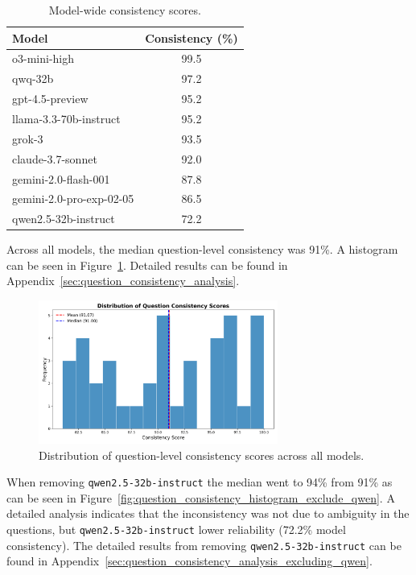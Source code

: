 \begin{table}[htbp]
    \centering
    \caption{Model-wide consistency scores.}
    \label{tab:model_consistency}
    \begin{tabular}{l c}
        \hline
        Model & Consistency (\%) \\
        \hline
        o3-mini-high & 99.5 \\
        qwq-32b & 97.2 \\
        gpt-4.5-preview & 95.2 \\
        llama-3.3-70b-instruct & 95.2 \\
        grok-3 & 93.5 \\
        claude-3.7-sonnet & 92.0 \\
        gemini-2.0-flash-001 & 87.8 \\
        gemini-2.0-pro-exp-02-05 & 86.5 \\
        qwen2.5-32b-instruct & 72.2 \\
        \hline
    \end{tabular}
\end{table}

Across all models, the median question-level consistency was 91\%. A histogram can be seen in Figure~\ref{fig:question_consistency_histogram}. Detailed results can be found in Appendix~\ref{sec:question_consistency_analysis}.

\begin{figure}[htbp]
    \centering
    \includegraphics[width=0.7\textwidth]{figures/histogram_question_consistency.png}
    \caption{Distribution of question-level consistency scores across all models.}
    \label{fig:question_consistency_histogram}
\end{figure}

When removing \texttt{qwen2.5-\allowbreak 32b-\allowbreak instruct} the median went to 94\% from 91\% as can be seen in Figure~\ref{fig:question_consistency_histogram_exclude_qwen}. A detailed analysis indicates that the inconsistency was not due to ambiguity in the questions, but \texttt{qwen2.5-\allowbreak 32b-\allowbreak instruct} lower reliability (72.2\% model consistency). The detailed results from removing \texttt{qwen2.5-\allowbreak 32b-\allowbreak instruct} can be found in Appendix~\ref{sec:question_consistency_analysis_excluding_qwen}.


